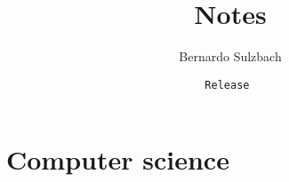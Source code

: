 \documentclass[12pt, oneside]{book}
\title{\Huge Notes}
\author{Bernardo Sulzbach}
\date{\texttt{Release }}
\begin{document}
\hypersetup{pageanchor=false} %
\begin{titlepage}
\maketitle
\end{titlepage}
\hypersetup{pageanchor=true}

\tableofcontents






\part{Computer science}











\printbibliography
\end{document}
